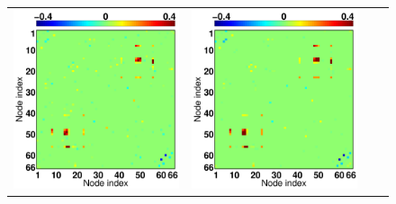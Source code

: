 \begin{figure}[ptbh]
\begin{tabular}{cccc}
		\includegraphics[width=\imwidth]{sim_best_weight_gnet100.pdf} &
		\includegraphics[width=\imwidth]{sim_best_weight_flas100.pdf} \vspace{-3pt}\\

\end{tabular}
\end{figure}
